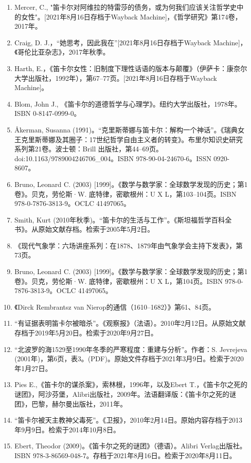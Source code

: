 \begin{enumerate}
\item Mercer, C., "笛卡尔对阿维拉的特雷莎的债务，或为何我们应该关注哲学史中的女性"。[2021年8月16日存档于Wayback Machine]，《哲学研究》第174卷，2017年。
\item Craig, D. J.，“她思考，因此我在”[2021年8月16日存档于Wayback Machine]，《哥伦比亚杂志》，2017年秋季。
\item Harth, E.，《笛卡尔女性：旧制度下理性话语的版本与颠覆》（伊萨卡：康奈尔大学出版社，1992年），第67–77页。[2021年8月16日存档于Wayback Machine]。
\item Blom, John J., 《笛卡尔的道德哲学与心理学》。纽约大学出版社，1978年。ISBN 0-8147-0999-0。
\item Åkerman, Susanna (1991)。“克里斯蒂娜与笛卡尔：解构一个神话”。《瑞典女王克里斯蒂娜及其圈子：17世纪哲学自由主义者的转变》。布里尔知识史研究系列第21卷。波士顿：Brill 出版社，第44–69页。doi:10.1163/9789004246706_004。ISBN 978-90-04-24670-6。ISSN 0920-8607。
\item Bruno, Leonard C. (2003) [1999]。《数学与数学家：全球数学发现的历史；第1卷》。贝克，劳伦斯·W. 底特律，密歇根州：U X L，第103–104页。ISBN 978-0-7876-3813-9。OCLC 41497065。
\item Smith, Kurt (2010年秋季)。“笛卡尔的生活与工作”。《斯坦福哲学百科全书》。从原始文献存档。检索于2005年5月2日。
\item 《现代气象学：六场讲座系列：在1878、1879年由气象学会主持下发表》，第73页。
\item Bruno, Leonard C. (2003) [1999]。《数学与数学家：全球数学发现的历史；第1卷》。贝克，劳伦斯·W. 底特律，密歇根州：U X L，第104页。ISBN 978-0-7876-3813-9。OCLC 41497065。
\item 《Dirck Rembrantsz van Nierop的通信（1610–1682）》第61、84页。
\item “有证据表明笛卡尔被暗杀”。《观察报》（法语）。2010年2月12日。从原始文献存档于2019年5月20日。检索于2020年9月27日。
\item “北波罗的海1529至1990年冬季的严寒程度：重建与分析”。作者：S. Jevrejeva (2001年)，第6页，表3。(PDF)。原始文件存档于2021年3月9日。检索于2020年1月27日。
\item Pies E.,《笛卡尔的谋杀案》，索林根，1996年，以及Ebert T.，《笛卡尔之死的谜团》，阿沙芬堡，Alibri出版社，2009年。法语翻译版：《笛卡尔之死的谜团》，巴黎，赫尔曼出版社，2011年。
\item “笛卡尔被天主教神父毒死”。《卫报》，2010年2月14日。原始内容存档于2013年9月9日。检索于2014年10月8日。
\item Ebert, Theodor (2009)。《笛卡尔之死的谜团》（德语）。Alibri Verlag出版社。ISBN 978-3-86569-048-7。存档于2021年8月16日。检索于2020年8月11日。

\end{enumerate}
